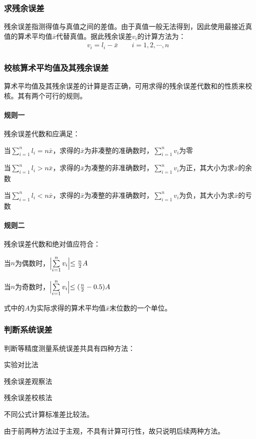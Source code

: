 \documentclass{ctexart}
\begin{document}
			\subsubsection{求残余误差}
				残余误差指测得值与真值之间的差值。由于真值一般无法得到，因此使用最接近真值的算术平均值$\bar{x}$代替真值。据此残余误差$v_i$的计算方法为：
				\begin{gather*}
					v_i=l_i - \bar{x}\qquad i = 1,2,\cdots,n
				\end{gather*}
			\subsubsection{校核算术平均值及其残余误差}
				算术平均值及其残余误差的计算是否正确，可用求得的残余误差代数和的性质来校核。其有两个可行的规则。
				\paragraph{规则一}
					残余误差代数和应满足：
					\begin{compactitem}
						\item 当$\sum \limits_{i=1}^n l_i=n\bar{x}$，求得的$\bar{x}$为非凑整的准确数时，$\sum \limits_{i=1}^n v_i$为零
						\item 当$\sum \limits_{i=1}^n l_i>n\bar{x}$，求得的$\bar{x}$为凑整的非准确数时，$\sum \limits_{i=1}^n v_i$为正，其大小为求$\bar{x}$的余数
						\item 当$\sum \limits_{i=1}^n l_i<n\bar{x}$，求得的$\bar{x}$为凑整的非准确数时，$\sum \limits_{i=1}^n v_i$为负，其大小为求$\bar{x}$的亏数
					\end{compactitem}
				\paragraph{规则二}
					残余误差代数和绝对值应符合：
					\begin{compactitem}
						\item 当$n$为偶数时，$\Bigl| \sum \limits_{i=1}^n v_i \Bigl| \leq \frac{n}{2}A$
						\item 当$n$为奇数时，$\Bigl| \sum \limits_{i=1}^n v_i \Bigl| \leq (\frac{n}{2}-0.5)A$
					\end{compactitem}
					式中的$A$为实际求得的算术平均值$\bar{x}$末位数的一个单位。
			\subsubsection{判断系统误差}
				判断等精度测量系统误差共具有四种方法：
				\begin{inparaenum}
					\item 实验对比法
					\item 残余误差观察法
					\item 残余误差校核法
					\item 不同公式计算标准差比较法。
				\end{inparaenum}
				由于前两种方法过于主观，不具有计算可行性，故只说明后续两种方法。
\end{document}
